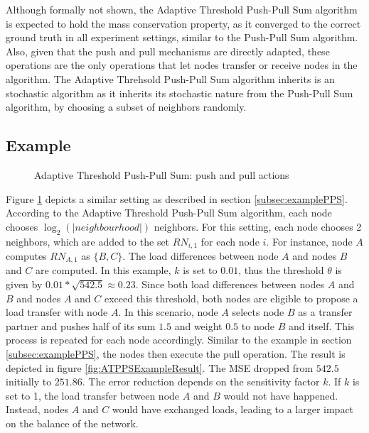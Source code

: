 Although formally not shown, the Adaptive Threshold Push-Pull Sum algorithm is expected to hold the mass conservation property, as it converged to the correct ground truth in all experiment settings, similar to the Push-Pull Sum algorithm. Also, given that the push and pull mechanisms are directly adapted, these operations are the only operations that let nodes transfer or receive nodes in the algorithm. The Adaptive Threhsold Push-Pull Sum algorithm inherits is an stochastic algorithm as it inherits its stochastic nature from the Push-Pull Sum algorithm, by choosing a subset of neighbors randomly.



\subsection{Example}\label{subsec:exampleAdaptiveThresholdPPS}
\begin{figure}
    \centering
    \scalebox{0.75}{}
    \caption{Adaptive Threshold Push-Pull Sum: push and pull actions}
    \label{fig:ATPPSExampleSetting}
\end{figure}

Figure \ref{fig:ATPPSExampleSetting} depicts a similar setting as described in section \ref{subsec:examplePPS}. According to the Adaptive Threshold Push-Pull Sum algorithm, each node chooses $\log_{2}{(|neighbourhood|)}$ neighbors. For this setting, each node chooses 2 neighbors, which are added to the set $RN_{i,1}$ for each node $i$. For instance, node $A$ computes $RN_{A,1}$ as $\{B,C\}$. The load differences between node $A$ and nodes $B$ and $C$ are computed. In this example, $k$ is set to $0.01$, thus the threshold $\theta$ is given by $0.01*\sqrt{542.5} \approx 0.23$. Since both load differences between nodes $A$ and $B$ and nodes $A$ and $C$ exceed this threshold, both nodes are eligible to propose a load transfer with node $A$. In this scenario, node $A$ selects node $B$ as a transfer partner and pushes half of its sum $1.5$ and weight $0.5$ to node $B$ and itself. This process is repeated for each node accordingly. Similar to the example in section \ref{subsec:examplePPS}, the nodes then execute the pull operation. The result is depicted in figure \ref{fig:ATPPSExampleResult}. The MSE dropped from $542.5$ initially to $251.86$. The error reduction depends on the sensitivity factor $k$. If $k$ is set to 1, the load transfer between node $A$ and $B$ would not have happened. Instead, nodes $A$ and $C$ would have exchanged loads, leading to a larger impact on the balance of the network. 

